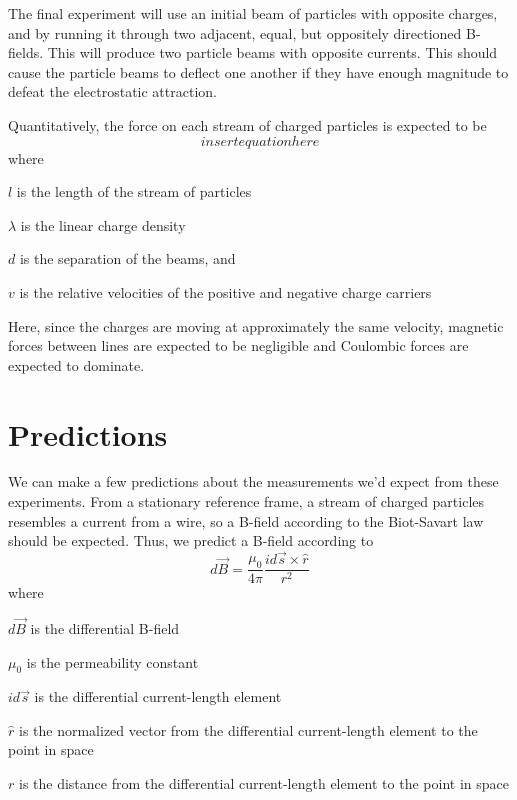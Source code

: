 \documentclass[12pt,letterpaper]{article}
\begin{document}
The final experiment will use an initial beam of particles with opposite charges, and by running it through two adjacent, equal, but oppositely directioned B-fields.
This will produce two particle beams with opposite currents. 
This should cause the particle beams to deflect one another if they have enough magnitude to defeat the electrostatic attraction.

Quantitatively, the force on each stream of charged particles is expected to be \[
insert equation here
\]
where
\begin{description}
\item $l$ is the length of the stream of particles
\item $\lambda$ is the linear charge density
\item $d$ is the separation of the beams, and 
\item $v$ is the relative velocities of the positive and negative charge carriers
\end{description}
Here, since the charges are moving at approximately the same velocity, magnetic forces between lines are expected to be negligible and Coulombic forces are expected to dominate.

\section{Predictions}

We can make a few predictions about the measurements we'd expect from these experiments. From a stationary reference frame, a stream of charged particles resembles a current from a wire, so a B-field according to the Biot-Savart law should be expected. Thus, we predict a B-field according to
\[
	d\vec{B} = \frac{\mu_0}{4\pi}\frac{id\vec{s} \times \hat{r}}{r^2}
\]
where
\begin{description}
	\item $d\vec{B}$ is the differential B-field
	\item $\mu_0$ is the permeability constant
	\item $id\vec{s}$ is the differential current-length element
	\item $\hat{r}$ is the normalized vector from the differential current-length element to the point in space
	\item $r$ is the distance from the differential current-length element to the point in space
\end{description}
\end{document}
